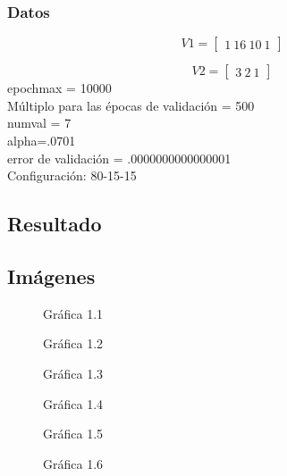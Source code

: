 \documentclass[6pt]{article}
\begin{document}
\subsubsection{Datos}
\[V1=
\begin{bmatrix}
1\ 16\ 10\ 1
\end{bmatrix}\]

\[V2=
\begin{bmatrix}
3\ 2\ 1
\end{bmatrix}\]
epochmax = 10000\\
Múltiplo para las épocas de validación = 500\\
numval = 7\\
alpha=.0701\\
error de validación = .0000000000000001\\
Configuración: 80-15-15
\subsection{Resultado}
\subsection{Imágenes}
\begin{figure}[htpb]
	\centering
	
	\caption{Gráfica 1.1}
\end{figure}

\begin{figure}[htpb]
	\centering
	
	\caption{Gráfica 1.2}
\end{figure}

\begin{figure}[htpb]
	\centering
	
	\caption{Gráfica 1.3}
\end{figure}

\begin{figure}[htpb]
	\centering
	
	\caption{Gráfica 1.4}
\end{figure}

\begin{figure}[htpb]
	\centering
	
	\caption{Gráfica 1.5}
\end{figure}

\begin{figure}[htpb]
	\centering
	
	\caption{Gráfica 1.6}
\end{figure}
\end{document}
